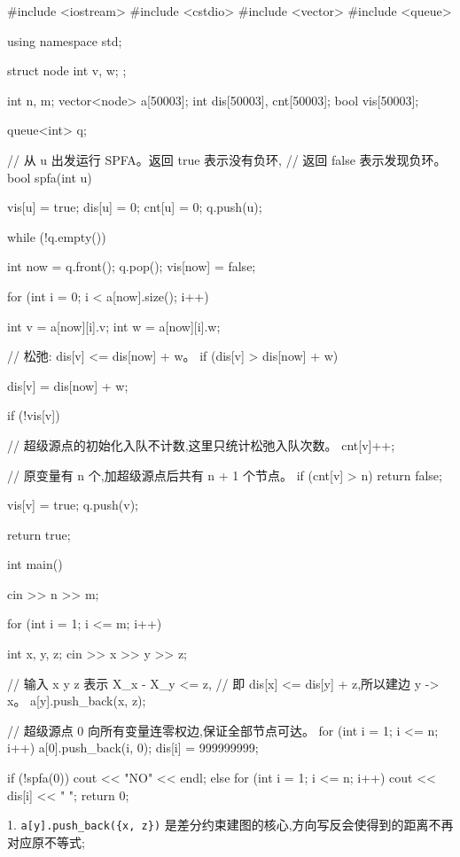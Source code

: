 \documentclass[UTF8,a4paper,11pt]{ctexart}
\newcommand{\topic}[1]{%
  \par\needspace{3\baselineskip}\vspace{0.45em}%
  \noindent{\bfseries\color{Primary}#1}\par\vspace{0.12em}%
}
\begin{document}
\begin{CodeBlock}
#include <iostream>
#include <cstdio>
#include <vector>
#include <queue>

using namespace std;

struct node {
    int v, w;
};

int n, m;
vector<node> a[50003];
int dis[50003], cnt[50003];
bool vis[50003];

queue<int> q;

// 从 u 出发运行 SPFA。返回 true 表示没有负环,
// 返回 false 表示发现负环。
bool spfa(int u) {
    vis[u] = true;
    dis[u] = 0;
    cnt[u] = 0;
    q.push(u);

    while (!q.empty()) {
        int now = q.front();
        q.pop();
        vis[now] = false;

        for (int i = 0; i < a[now].size(); i++) {
            int v = a[now][i].v;
            int w = a[now][i].w;

            // 松弛: dis[v] <= dis[now] + w。
            if (dis[v] > dis[now] + w) {
                dis[v] = dis[now] + w;

                if (!vis[v]) {
                    // 超级源点的初始化入队不计数,这里只统计松弛入队次数。
                    cnt[v]++;

                    // 原变量有 n 个,加超级源点后共有 n + 1 个节点。
                    if (cnt[v] > n)
                        return false;

                    vis[v] = true;
                    q.push(v);
                }
            }
        }
    }
    return true;
}

int main() {
    cin >> n >> m;

    for (int i = 1; i <= m; i++) {
        int x, y, z;
        cin >> x >> y >> z;

        // 输入 x y z 表示 X_x - X_y <= z,
        // 即 dis[x] <= dis[y] + z,所以建边 y -> x。
        a[y].push_back({x, z});
    }

    // 超级源点 0 向所有变量连零权边,保证全部节点可达。
    for (int i = 1; i <= n; i++) {
        a[0].push_back({i, 0});
        dis[i] = 999999999;
    }

    if (!spfa(0))
        cout << "NO" << endl;
    else {
        for (int i = 1; i <= n; i++)
            cout << dis[i] << " ";
    }
    return 0;
}
\end{CodeBlock}

\topic{模板要点}

1. \verb|a[y].push_back({x, z})| 是差分约束建图的核心,方向写反会使得到的距离不再对应原不等式;
\end{document}
